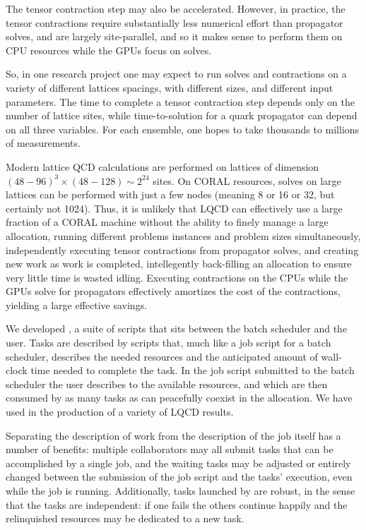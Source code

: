 The tensor contraction step may also be accelerated.
However, in practice, the tensor contractions require substantially less numerical effort than propagator solves, and are largely site-parallel, and so it makes sense to perform them on CPU resources while the GPUs focus on solves.

So, in one research project one may expect to run solves and contractions on a variety of different lattices spacings, with different sizes, and different input parameters.
The time to complete a tensor contraction step depends only on the number of lattice sites, while time-to-solution for a quark propagator can depend on all three variables.
For each ensemble, one hopes to take thousands to millions of measurements.

Modern lattice QCD calculations are performed on lattices of dimension $(48-96)^3\times(48-128) \sim 2^24$ sites.
On CORAL resources, solves on large lattices can be performed with just a few nodes (meaning 8 or 16 or 32, but certainly not 1024).
Thus, it is unlikely that LQCD can effectively use a large fraction of a CORAL machine without the ability to finely manage a large allocation, running different problems instances and problem sizes simultaneously, independently executing tensor contractions from propagator solves, and creating new work as work is completed, intellegently back-filling an allocation to ensure very little time is wasted idling.
Executing contractions on the CPUs while the GPUs solve for propagators effectively amortizes the cost of the contractions, yielding a large effective savings.

We developed \metaq \cite{Berkowitz:2017vcp,Berkowitz:2017xna}, a suite of \bash scripts that sits between the batch scheduler and the user.
Tasks are described by scripts that, much like a job script for a batch scheduler, describes the needed resources and the anticipated amount of wall-clock time needed to complete the task.
In the job script submitted to the batch scheduler the user describes to \metaq the available resources, and which are then consumed by as many tasks as can peacefully coexist in the allocation.
We have used \metaq in the production of a variety of LQCD results\cite{Nicholson:2016byl,Berkowitz:2017opd,Chang:2017oll,Berkowitz:2017gql,Chang:2018gA}.

Separating the description of work from the description of the job itself has a number of benefits: multiple collaborators may all submit tasks that can be accomplished by a single job, and the waiting tasks may be adjusted or entirely changed between the submission of the job script and the tasks' execution, even while the job is running.
Additionally, tasks launched by \metaq are robust, in the sense that the tasks are independent: if one fails the others continue happily and the relinquished resources may be dedicated to a new task.

